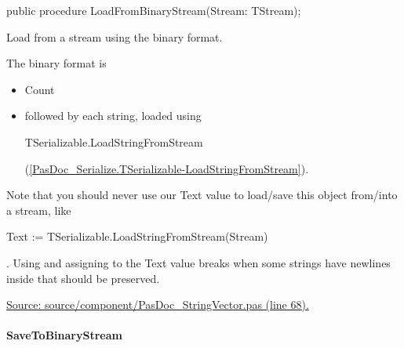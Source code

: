 \documentclass{report}
\newif\ifpdf
\begin{document}
\label{PasDoc_StringVector.TStringVector-LoadFromBinaryStream}
\begin{list}{}{
\setlength{\itemindent}{0cm}
\setlength{\listparindent}{0cm}
\setlength{\leftmargin}{\evensidemargin}
\addtolength{\leftmargin}{\tmplength}
\settowidth{\labelsep}{X}
\addtolength{\leftmargin}{\labelsep}
\setlength{\labelwidth}{\tmplength}
}
\item[\textbf{Declaration}\hfill]
\ifpdf
\begin{flushleft}
\fi
\begin{ttfamily}
public procedure LoadFromBinaryStream(Stream: TStream);\end{ttfamily}

\ifpdf
\end{flushleft}
\fi

\par
\item[\textbf{Description}]
Load from a stream using the binary format.

The binary format is \begin{itemize}
\item Count
\item followed by each string, loaded using \begin{ttfamily}TSerializable.LoadStringFromStream\end{ttfamily}(\ref{PasDoc_Serialize.TSerializable-LoadStringFromStream}).
\end{itemize}

Note that you should never use our Text value to load/save this object from/into a stream, like \begin{ttfamily}Text := TSerializable.LoadStringFromStream(Stream)\end{ttfamily}. Using and assigning to the Text value breaks when some strings have newlines inside that should be preserved.\par
\href{https://github.com/pasdoc/pasdoc/blob/master/source/component/PasDoc_StringVector.pas#L68}{Source: source/component/PasDoc{\_}StringVector.pas (line 68).}

\end{list}
\paragraph*{SaveToBinaryStream}\hspace*{\fill}
\end{document}
